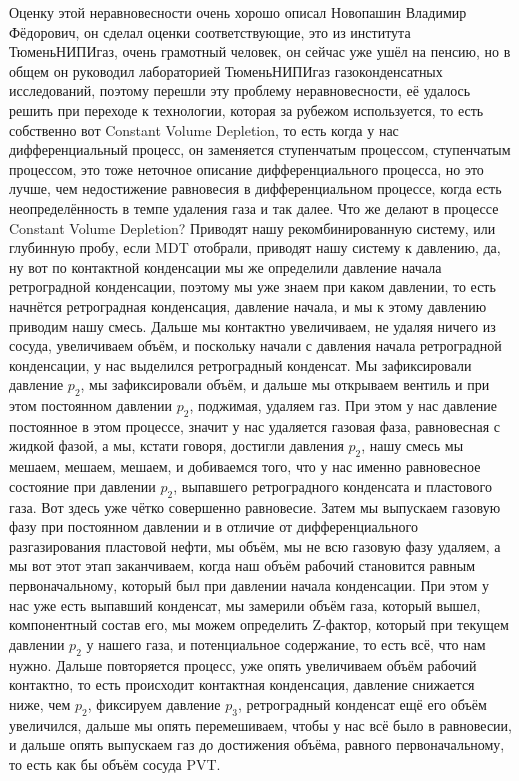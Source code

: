 \documentclass[main.tex]{subfiles}
\begin{document}
Оценку этой неравновесности очень хорошо описал Новопашин Владимир Фёдорович, он сделал оценки соответствующие, это из института ТюменьНИПИгаз, очень грамотный человек, он сейчас уже ушёл на пенсию, но в общем он руководил лабораторией ТюменьНИПИгаз газоконденсатных исследований, поэтому перешли эту проблему неравновесности, её удалось решить при переходе к технологии, которая за рубежом используется, то есть собственно вот Constant Volume Depletion, то есть когда у нас дифференциальный процесс, он заменяется ступенчатым процессом, ступенчатым процессом, это тоже неточное описание дифференциального процесса, но это лучше, чем недостижение равновесия в дифференциальном процессе, когда есть неопределённость в темпе удаления газа и так далее.
Что же делают в процессе Constant Volume Depletion?
Приводят нашу рекомбинированную систему, или глубинную пробу, если MDT отобрали, приводят нашу систему к давлению, да, ну вот по контактной конденсации мы же определили давление начала ретроградной конденсации, поэтому мы уже знаем при каком давлении, то есть начнётся ретроградная конденсация, давление начала, и мы к этому давлению приводим нашу смесь.
Дальше мы контактно увеличиваем, не удаляя ничего из сосуда, увеличиваем объём, и поскольку начали с давления начала ретроградной конденсации, у нас выделился ретроградный конденсат.
Мы зафиксировали давление $p_2$, мы зафиксировали объём, и дальше мы открываем вентиль и при этом постоянном давлении $p_2$, поджимая, удаляем газ.
При этом у нас давление постоянное в этом процессе, значит у нас удаляется газовая фаза, равновесная с жидкой фазой, а мы, кстати говоря, достигли давления $p_2$, нашу смесь мы мешаем, мешаем, мешаем, и добиваемся того, что у нас именно равновесное состояние при давлении $p_2$, выпавшего ретроградного конденсата и пластового газа.
Вот здесь уже чётко совершенно равновесие.
Затем мы выпускаем газовую фазу при постоянном давлении и в отличие от дифференциального разгазирования пластовой нефти, мы объём, мы не всю газовую фазу удаляем, а мы вот этот этап заканчиваем, когда наш объём рабочий становится равным первоначальному, который был при давлении начала конденсации.
При этом у нас уже есть выпавший конденсат, мы замерили объём газа, который вышел, компонентный состав его, мы можем определить Z-фактор, который при текущем давлении $p_2$ у нашего газа, и потенциальное содержание, то есть всё, что нам нужно.
Дальше повторяется процесс, уже опять увеличиваем объём рабочий контактно, то есть происходит контактная конденсация, давление снижается ниже, чем $p_2$, фиксируем давление $p_3$, ретроградный конденсат ещё его объём увеличился, дальше мы опять перемешиваем, чтобы у нас всё было в равновесии, и дальше опять выпускаем газ до достижения объёма, равного первоначальному, то есть как бы объём сосуда PVT.
\end{document}
